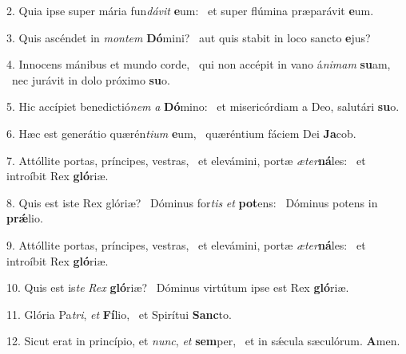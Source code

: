 2. Quia ipse super mária fun\textit{dá}\textit{vit} \textbf{e}um: \ast\  et super flúmina præparávit \textbf{e}um.\

3. Quis ascéndet in \textit{mon}\textit{tem} \textbf{Dó}mini? \ast\  aut quis stabit in loco sancto \textbf{e}jus?\

4. Innocens mánibus et mundo corde, \dag\  qui non accépit in vano á\textit{ni}\textit{mam} \textbf{su}am, \ast\  nec jurávit in dolo próximo \textbf{su}o.\

5. Hic accípiet benedictió\textit{nem} \textit{a} \textbf{Dó}mino: \ast\  et misericórdiam a Deo, salutári \textbf{su}o.\

6. Hæc est generátio quærén\textit{ti}\textit{um} \textbf{e}um, \ast\  quæréntium fáciem Dei \textbf{Ja}cob.\

7. Attóllite portas, príncipes, vestras, \dag\  et elevámini, portæ \textit{æ}\textit{ter}\textbf{ná}les: \ast\  et introíbit Rex \textbf{gló}riæ.\

8. Quis est iste Rex glóriæ? \dag\  Dóminus for\textit{tis} \textit{et} \textbf{pot}ens: \ast\  Dóminus potens in \textbf{prǽ}lio.\

9. Attóllite portas, príncipes, vestras, \dag\  et elevámini, portæ \textit{æ}\textit{ter}\textbf{ná}les: \ast\  et introíbit Rex \textbf{gló}riæ.\

10. Quis est is\textit{te} \textit{Rex} \textbf{gló}riæ? \ast\  Dóminus virtútum ipse est Rex \textbf{gló}riæ.\

11. Glória Pa\textit{tri}, \textit{et} \textbf{Fí}lio, \ast\  et Spirítui \textbf{Sanc}to.\

12. Sicut erat in princípio, et \textit{nunc}, \textit{et} \textbf{sem}per, \ast\  et in sǽcula sæculórum. \textbf{A}men.\


